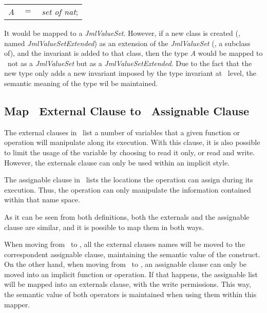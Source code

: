 \begin{center}
\begin{tabular}{lll}
\textit{A} & $=$ & \textit{set of nat};\\
\end{tabular}
\end{center}

It would be mapped to a \textit{JmlValueSet}. However, if a new class is created (\eg, named \textit{JmlValueSetExtended}) as an extension of the \textit{JmlValueSet} (\ie, a subclass of), and the invariant is added to that class, then the type \textit{A} would be mapped to \jml\ not as a \textit{JmlValueSet} but as a \textit{JmlValueSetExtended}. Due to the fact that the new type only adds a new invariant imposed by the type invariant at \vpp\ level, the semantic meaning of the type wil be maintained.


\subsection{Map \vpp\ External Clause to \jml\ Assignable Clause}

The external clauses in \vpp\ list a number of variables that a given function or operation will manipulate along its execution. With this clause, it is also possible to limit the usage of the variable by choosing to read it only, or read and write. However, the externals clause can only be used within an implicit style.

The assignable clause in \jml\ lists the locations the operation can assign during its execution. Thus, the operation can only manipulate the information contained within that name space. 

As it can be seen from both definitions, both the externals and the assignable clause are similar, and it is possible to map them in both ways.

When moving from \vpp\ to \jml, all the external clauses names will be moved to the correspondent assignable clause, maintaining the semantic value of the construct. On the other hand, when moving from \jml\ to \vpp, an assignable clause can only be moved into an implicit function or operation. If that happens, the assignable list will be mapped into an externals clause, with the write permissions. This way, the semantic value of both operators is maintained when using them within this mapper.  




